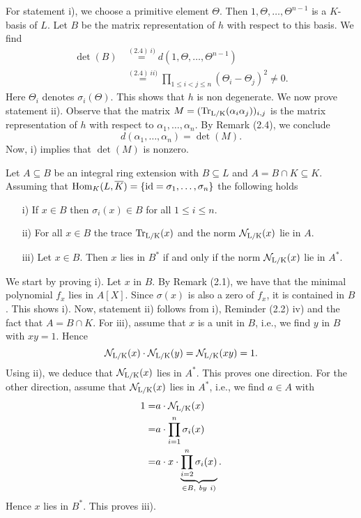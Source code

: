 \begin{Bew}
	For statement i), we choose a primitive element $\Theta$. Then $1, \Theta,\dots,\Theta^{n-1}$ is a $K$-basis of $L$. Let $B$ be the matrix representation of $h$ with respect to this basis. We find
	\begin{align*}
		\det(B)&\stackrel{(2.4)~i)}{=}d(1,\Theta,\dots,\Theta^{n-1})\\
		&\stackrel{(2.4)~ii)}{=} \prod_{1\le i<j\le n} (\Theta_i-\Theta_j)^2 \neq 0.
	\end{align*}
	Here $\Theta_i$ denotes $\sigma_i(\Theta)$. This shows that $h$ is non degenerate. We now prove statement ii). Observe that the matrix $M=(\operatorname{Tr_{L/K}}(\alpha_i\alpha_j))_{i,j}$ is the matrix representation of $h$ with respect to $\alpha_1,\dots,\alpha_n$. By Remark (2.4), we conclude
	$$d(\alpha_1,\dots,\alpha_n)=\det(M).$$
	Now, i) implies that $\det(M)$ is nonzero.
\end{Bew}

\begin{Bem}
	Let $A\subseteq B$ be an integral ring extension with $B\subseteq L$ and $A=B\cap K\subseteq K$. Assuming that $\operatorname{Hom}_K(L,\overline{K})=\{\operatorname{id}=\sigma_1,\dots,\sigma_n \}$ the following holds
		\begin{itemize}
			\item [i)] If $x\in B$ then $\sigma_i(x)\in B$ for all $1\le i \le n$. 
			\item [ii)] For all $x\in B$ the trace $\operatorname{Tr_{L/K}}(x)$ and the norm $\operatorname{\mathcal{N}_{L/K}}(x)$ lie in $A$.
			\item [iii)]  Let $x\in B$. Then $x$ lies in $B^*$ if and only if the norm $\operatorname{\mathcal{N}_{L/K}}(x)$ lie in $A^*$.
		\end{itemize}
\end{Bem}

\begin{Bew}
	We start by proving i). Let $x$ in $B$. By Remark (2.1), we have that the minimal polynomial $f_x$ lies in $A[X]$. Since $\sigma(x)$ is also a zero of $f_x$, it is contained in $B$. This shows i). Now, statement ii) follows from i), Reminder (2.2) iv) and the fact that $A=B\cap K$. For iii), assume that $x$ is a unit in $B$, i.e., we find $y$ in $B$ with $xy=1$. Hence $$\operatorname{\mathcal{N}_{L/K}}(x)\cdot\operatorname{\mathcal{N}_{L/K}}(y)=\operatorname{\mathcal{N}_{L/K}}(xy)=1.$$ Using ii), we deduce that $\operatorname{\mathcal{N}_{L/K}}(x)$ lies in $A^*$. This proves one direction. For the other direction, assume that $\operatorname{\mathcal{N}_{L/K}}(x)$ lies in $A^*$, i.e., we find $a\in A$ with 
	\begin{align*}
		1=&a\cdot\operatorname{\mathcal{N}_{L/K}}(x)\\
		=&a\cdot\prod_{i=1}^{n}\sigma_i(x)\\
		=&a\cdot x\cdot\underbrace{\prod_{i=2}^{n}\sigma_i(x)}_{\in B, ~by~ i)}.
	\end{align*}
	Hence $x$ lies in $B^*$. This proves iii).
\end{Bew}

